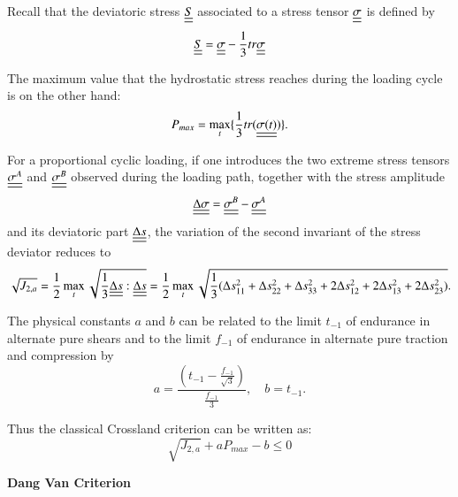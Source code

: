 \documentclass[3p,times,procedia,number]{elsarticle}
\begin{document}
Recall that the deviatoric stress $\uline{\uline{S}}$ associated to a stress tensor $\uline{\uline{\sigma}}$  is defined by
\begin{equation} \uline{\uline{S}}=\uline{\uline{\sigma}}-\frac{1}{3}tr\uline{\uline{\sigma}} 
\end{equation}

The maximum value that the hydrostatic stress reaches during the loading cycle is on the other hand:
\begin{equation}
	P_{max}=\max\limits_{t}\{\frac{1}{3}tr(\uline{\uline{\sigma(t)}})\}.
\end{equation}

For a proportional cyclic loading, if one introduces the two extreme stress tensors $\uline{\uline{\sigma^A}}$ and $\uline{\uline{\sigma^B}}$ observed during the loading path, together with the stress amplitude
\begin{equation}\uline{\uline{\Delta\sigma}}=\uline{\uline{\sigma^B}}-\uline{\uline{\sigma^A}}\end{equation}
and its deviatoric part $\uline{\uline{\Delta s}} $, the variation of
the second invariant of the stress deviator reduces to 
\begin{equation}\sqrt{J_{2,a}}=\frac{1}{2}\max\limits_{t}\sqrt{\frac{1}{3}\uline{\uline{\Delta s}}:\uline{\uline{\Delta s}}}=\frac{1}{2}\max\limits_{t}\sqrt{\frac{1}{3}(\Delta s_{11}^2+\Delta s_{22}^2+\Delta s_{33}^2+2\Delta s_{12}^2+2\Delta s_{13}^2+2\Delta s_{23}^2)}.\end{equation}

The physical constants $a$ and $b$ can be related to  the limit $t_{-1}$ of endurance in alternate pure shears and to the limit $f_{-1}$ of endurance in alternate pure traction and compression by
\begin{equation}
	a=\frac{(t_{-1}-\frac{f_{-1}}{\sqrt{3}})}{\frac{f_{-1}}{3}}, \quad 
	b=t_{-1}.
\end{equation}

Thus the classical Crossland criterion can be written as:
\begin{equation}
	\sqrt{J_{2,a}}+a{P_{max}}-b\leqslant 0
\end{equation}

\textbf{Dang Van Criterion}
\end{document}
